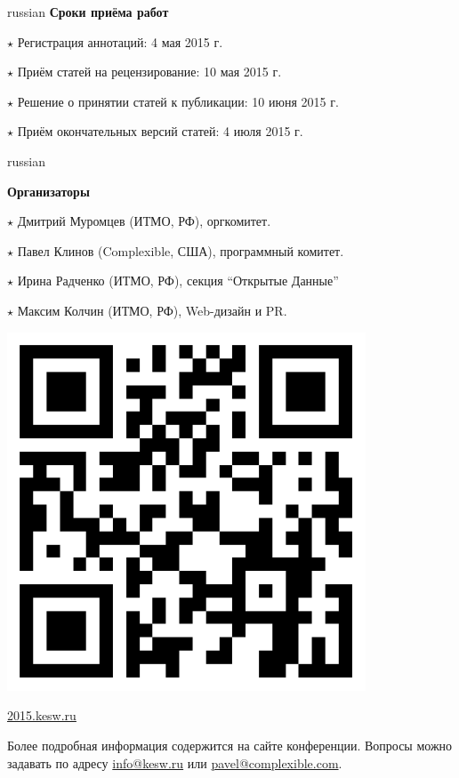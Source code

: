 \documentclass[a4paper, 10pt]{article}
\renewcommand{\skip}{\vspace{1ex}}
\renewcommand{\bullet}{\ensuremath{\star} }
\begin{document}
\begin{otherlanguage*}{russian}
\noindent\textbf{Сроки приёма работ}

\skip

\noindent
\bullet Регистрация аннотаций: 4 мая 2015 г.

\noindent
\bullet Приём статей на рецензирование: 10 мая 2015 г.

\noindent
\bullet Решение о принятии статей к публикации: 10 июня 2015 г.

\noindent
\bullet Приём окончательных версий статей: 4 июля 2015 г.

\skip

\hspace*{-\parindent}%
\begin{minipage}{.80\textwidth}
\begin{otherlanguage*}{russian}

\textbf{Организаторы}

\skip

\noindent
\bullet Дмитрий Муромцев (ИТМО, РФ), оргкомитет.

\bullet Павел Клинов (Complexible, США), программный комитет.

\bullet Ирина Радченко (ИТМО, РФ), секция ``Открытые Данные'' 

\bullet Максим Колчин (ИТМО, РФ), Web-дизайн и PR.

\end{otherlanguage*}
\end{minipage}
\begin{minipage}{.20\textwidth}
\includegraphics[width=0.8\textwidth]{qrcode}

\footnotesize{\url{2015.kesw.ru}}
\end{minipage}
\hfill


\vfill

\noindent Более подробная информация содержится на сайте конференции. Вопросы можно задавать по адресу \url{info@kesw.ru} 
или \url{pavel@complexible.com}.



\end{otherlanguage*}
\end{document}
